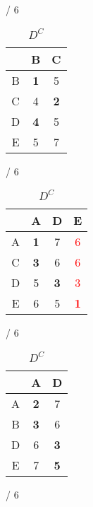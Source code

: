 \documentclass[a4paper, 11 pt, article, accentcolor=tud7b]{tudreport}
\begin{document}
			\begin{table}[h]
	  \begin{subtable}[b]{\textwidth / 6}
	    \begin{tabular}{| c | c | c |}
	      \hline
	        & B                   & C          \\ \hline
	      B & \textbf{1}          & 5          \\ \hline
	      C & 4                   & \textbf{2} \\ \hline
	      D & \textbf{4}          & 5          \\ \hline
	      E & 5                   & 7          \\ \hline
	    \end{tabular}
	    \caption{$D^{A}$}
	  \end{subtable}
	  \hfill
	  \begin{subtable}[b]{\textwidth / 6}
	    \begin{tabular}{| c | c | c | c |}
	    \hline
	      & A                   & D          & E                  \\ \hline
	    A & \textbf{1}          & 7          & \textcolor{red}{6} \\ \hline
	    C & \textbf{3}          & 6          & \textcolor{red}{6} \\ \hline
	    D & 5                   & \textbf{3} & \textcolor{red}{3} \\ \hline
	    E & 6                   & 5          & \textbf{\textcolor{red}{1}} \\ \hline
	    \end{tabular}
	    \caption{$D^{B}$}
	  \end{subtable}
	  \hfill
	  \begin{subtable}[b]{\textwidth / 6}
	    \begin{tabular}{| c | c | c |}
	    \hline
	      & A                   & D          \\ \hline
	    A & \textbf{2}          & 7          \\ \hline
	    B & \textbf{3}          & 6          \\ \hline
	    D & 6                   & \textbf{3} \\ \hline
	    E & 7                   & \textbf{5} \\ \hline
	    \end{tabular}
	    \caption{$D^{C}$}
	  \end{subtable}
    \hfill
	  \begin{subtable}[b]{\textwidth / 6}

\end{subtable}
\end{table}
\end{document}
